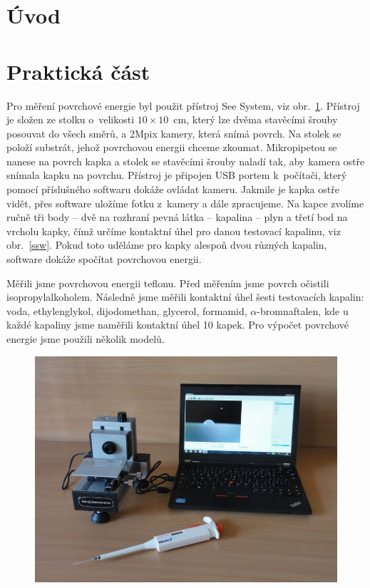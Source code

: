 \documentclass{protokol}
\begin{document}
\header
\section{Úvod}

\section{Praktická část}
\par Pro měření povrchové energie byl použit přístroj See System, viz 
obr.~\ref{ss}. Přístroj je složen ze stolku o~velikosti $10 \times 10$~cm, 
který lze dvěma stavěcími šrouby posouvat do všech směrů, a 2Mpix kamery, která 
snímá povrch. Na stolek se položí substrát, jehož povrchovou energii chceme 
zkoumat. Mikropipetou se nanese na povrch kapka a stolek se stavěcími šrouby 
naladí tak, aby kamera ostře snímala kapku na povrchu. Přístroj je připojen USB 
portem k~počítači, který pomocí příslušného softwaru dokáže ovládat kameru. 
Jakmile je kapka ostře vidět, přes software uložíme fotku z~kamery a dále 
zpracujeme. Na kapce zvolíme ručně tři body -- dvě na rozhraní pevná látka -- 
kapalina -- plyn a třetí bod na vrcholu kapky, čímž určíme kontaktní úhel pro 
danou testovací kapalinu, viz obr.~\ref{ssw}. Pokud toto uděláme pro kapky 
alespoň dvou různých kapalin, software dokáže spočítat povrchovou energii.

\par Měřili jsme povrchovou energii teflonu. Před měřením jsme povrch očistili 
isopropylalkoholem. Následně jsme měřili kontaktní úhel šesti testovacích 
kapalin: voda, ethylenglykol, dijodomethan, glycerol, formamid, 
$\alpha$-bromnaftalen, kde u každé kapaliny jsme naměřili kontaktní úhel 10 
kapek. Pro výpočet povrchové energie jsme použili několik 
modelů.

\begin{figure}
	\begin{center}
		\includegraphics[width=\textwidth]{seesystem.jpg}
		\label{ss}
	\end{center} 
\end{figure}
\end{document}
